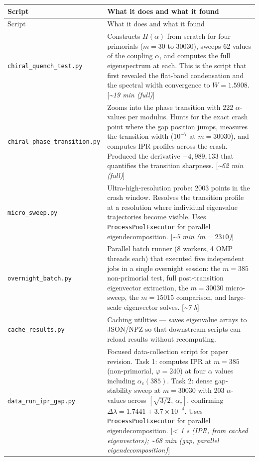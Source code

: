 \documentclass[11pt,letterpaper]{article}
\theoremstyle{definition}
\theoremstyle{remark}
\begin{document}
\begin{longtable}[]{@{}
  >{\raggedright\arraybackslash}p{}
  >{\raggedright\arraybackslash}p{}@{}}
\toprule
Script & What it does and what it found \\
\midrule
\endfirsthead
\toprule
Script & What it does and what it found \\
\midrule
\endhead
\texttt{chiral\_quench\_test.py} & Constructs $H(\alpha)$ from scratch for four primorials ($m = 30$ to $30030$), sweeps 62 values of the coupling $\alpha$, and computes the full eigenspectrum at each. This is the script that first revealed the flat-band condensation and the spectral width convergence to $W = 1.5908$. [\textit{\textasciitilde19 min (full)}] \\
\texttt{chiral\_phase\_transition.py} & Zooms into the phase transition with 222 $\alpha$-values per modulus. Hunts for the exact crash point where the gap position jumps, measures the transition width ($10^{-7}$ at $m = 30030$), and computes IPR profiles across the crash. Produced the derivative $-4{,}989{,}133$ that quantifies the transition sharpness. [\textit{\textasciitilde62 min (full)}] \\
\texttt{micro\_sweep.py} & Ultra-high-resolution probe: 2003 points in the crash window. Resolves the transition profile at a resolution where individual eigenvalue trajectories become visible. Uses \texttt{ProcessPoolExecutor} for parallel eigendecomposition. [\textit{\textasciitilde5 min ($m = 2310$)}] \\
\texttt{overnight\_batch.py} & Parallel batch runner (8 workers, 4 OMP threads each) that executed five independent jobs in a single overnight session: the $m = 385$ non-primorial test, full post-transition eigenvector extraction, the $m = 30030$ micro-sweep, the $m = 15015$ comparison, and large-scale eigenvector solves. [\textit{\textasciitilde7 h}] \\
\texttt{cache\_results.py} & Caching utilities --- saves eigenvalue arrays to JSON/NPZ so that downstream scripts can reload results without recomputing. \\
\texttt{data\_run\_ipr\_gap.py} & Focused data-collection script for paper revision. Task 1: computes IPR at $m = 385$ (non-primorial, $\varphi = 240$) at four $\alpha$ values including $\alpha_c(385)$. Task 2: dense gap-stability sweep at $m = 30030$ with 203 $\alpha$-values across $[\sqrt{3/2},\, \alpha_c]$, confirming $\Delta\lambda = 1.7441 \pm 3.7 \times 10^{-4}$. Uses \texttt{ProcessPoolExecutor} for parallel eigendecomposition. [\textit{\textless{} 1 s (IPR, from cached eigenvectors); \textasciitilde68 min (gap, parallel eigendecomposition)}] \\

\end{longtable}
\end{document}
